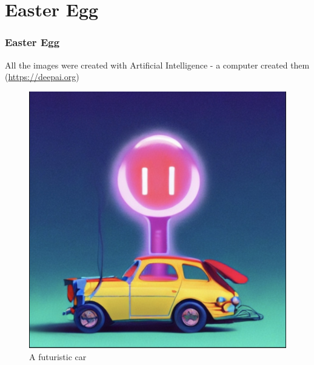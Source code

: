 \documentclass[
	11pt,
	t,
]{beamer}
\begin{document}
\section{Easter Egg}

\begin{frame}
	\frametitle{Easter Egg}
	All the images were created with Artificial Intelligence - a computer created them (\href{DeepAI}{https://deepai.org})
	\bigskip
	\begin{figure}
	  \includegraphics[scale=0.3]{4.jpg}
	  \caption{A futuristic car}
	\end{figure}
\end{frame}
\end{document}
